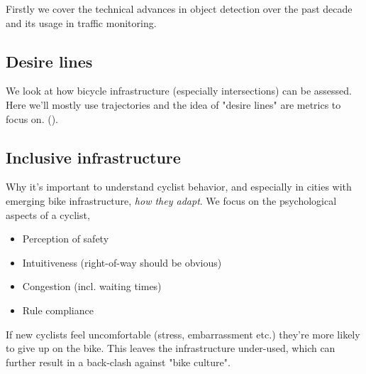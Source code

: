 Firstly we cover the technical advances in object detection over the past decade and its usage in traffic monitoring.

\subsection{Desire lines}
We look at how bicycle infrastructure (especially intersections) can be assessed. Here we'll mostly use 
trajectories and the idea of "desire lines" are metrics to focus on. (\cite{situ}). 



\subsection{Inclusive infrastructure}
Why it's important to understand cyclist behavior, and especially in cities with emerging bike infrastructure, \textit{how they adapt}.
We focus on the psychological aspects of a cyclist,

\begin{itemize}
	\item Perception of safety
	\item Intuitiveness (right-of-way should be obvious)
	\item Congestion (incl. waiting times)
	\item Rule compliance
\end{itemize}

If new cyclists feel uncomfortable (stress, embarrassment etc.) they're more likely to give up on the bike. This leaves the infrastructure 
under-used, which can further result in a back-clash against "bike culture".